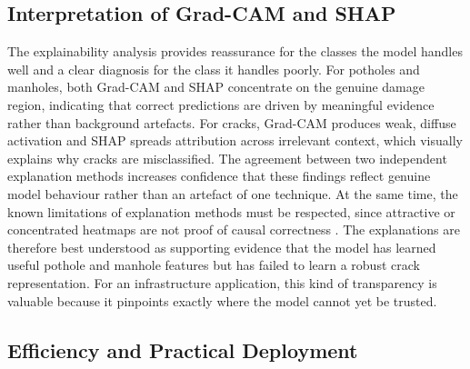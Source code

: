 \documentclass[preprint,12pt]{elsarticle}
\begin{document}
\subsection{Interpretation of Grad-CAM and SHAP}

The explainability analysis provides reassurance for the classes the model handles well and a clear diagnosis for the class it handles poorly.
For potholes and manholes, both Grad-CAM and SHAP concentrate on the genuine damage region, indicating that correct predictions are driven by meaningful evidence rather than background artefacts.
For cracks, Grad-CAM produces weak, diffuse activation and SHAP spreads attribution across irrelevant context, which visually explains why cracks are misclassified.
The agreement between two independent explanation methods increases confidence that these findings reflect genuine model behaviour rather than an artefact of one technique.
At the same time, the known limitations of explanation methods must be respected, since attractive or concentrated heatmaps are not proof of causal correctness \cite{selvaraju2017gradcam, lundberg2017unified}.
The explanations are therefore best understood as supporting evidence that the model has learned useful pothole and manhole features but has failed to learn a robust crack representation.
For an infrastructure application, this kind of transparency is valuable because it pinpoints exactly where the model cannot yet be trusted.

\subsection{Efficiency and Practical Deployment}
\end{document}
